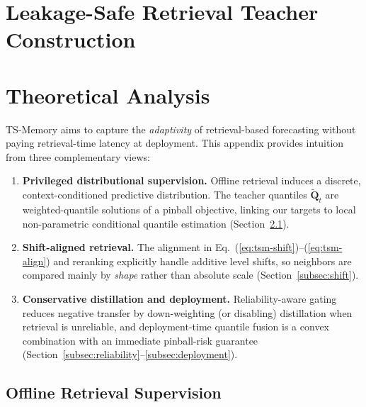 


\section{Leakage-Safe Retrieval Teacher Construction}
\label{appx:Offline_Teacher_Construction_Algorithm}




\section{Theoretical Analysis}
\label{sec:theory}

TS-Memory aims to capture the \emph{adaptivity} of retrieval-based forecasting without paying retrieval-time
latency at deployment. This appendix provides intuition from three complementary views:
\begin{enumerate}
    \item \textbf{Privileged distributional supervision.} Offline retrieval induces a discrete,
    context-conditioned predictive distribution. The teacher quantiles $\widetilde{\mathbf{Q}}_t$
    are weighted-quantile solutions of a pinball objective, linking our targets to local
    non-parametric conditional quantile estimation (Section~\ref{subsec:teacher}).
    \item \textbf{Shift-aligned retrieval.} The alignment in Eq.~(\ref{eq:tsm-shift})--(\ref{eq:tsm-align})
    and reranking explicitly handle additive level shifts, so neighbors are compared mainly by
    \emph{shape} rather than absolute scale (Section~\ref{subsec:shift}).
    \item \textbf{Conservative distillation and deployment.} Reliability-aware gating reduces negative
    transfer by down-weighting (or disabling) distillation when retrieval is unreliable, and
    deployment-time quantile fusion is a convex combination with an immediate pinball-risk guarantee
    (Section~\ref{subsec:reliability}--\ref{subsec:deployment}).
\end{enumerate}

\subsection{Offline Retrieval Supervision}
\label{subsec:teacher}

